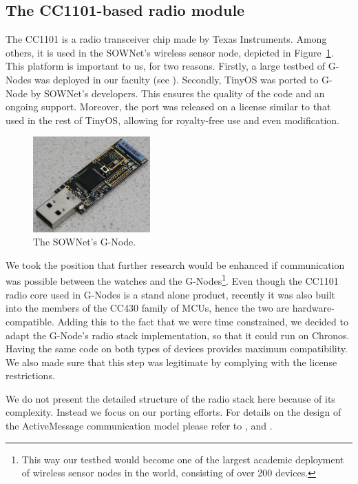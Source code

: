 \subsection{The CC1101-based radio module}

The CC1101 is a radio transceiver chip made by Texas Instruments. Among others, it is used in the SOWNet's \cite{G-Node} wireless sensor node, depicted in Figure~\ref{fig:gnode}. This platform is important to us, for two reasons. Firstly, a large testbed of G-Nodes was deployed in our faculty (see \cite{SensorNet}). Secondly, TinyOS was ported to G-Node by SOWNet's developers. This ensures the quality of the code and an ongoing support. Moreover, the port was released on a license similar to that used in the rest of TinyOS, allowing for royalty-free use and even modification.

\begin{figure}[h]
  \centering
  \includegraphics[width=0.4\textwidth]{img/gnode.jpg}
  \caption{The SOWNet's G-Node.}
  \label{fig:gnode}
\end{figure}
We took the position that further research would be enhanced if communication was possible between the watches and the G-Nodes\footnote{This way our testbed would become one of the largest academic deployment of wireless sensor nodes in the world, consisting of over 200 devices.}. Even though the CC1101 radio core used in G-Nodes is a stand alone product, recently it was also built into the members of the CC430 family of MCUs, hence the two are hardware-compatible. Adding this to the fact that we were time constrained, we decided to adapt the G-Node's radio stack implementation, so that it could run on Chronos. Having the same code on both types of devices provides maximum compatibility. We also made sure that this step was legitimate by complying with the license restrictions.

We do not present the detailed structure of the radio stack here because of its complexity. Instead we focus on our porting efforts. For details on the design of the ActiveMessage communication model please refer to \cite{BHC}, \cite{TEP116} and \cite{TEP126}.

